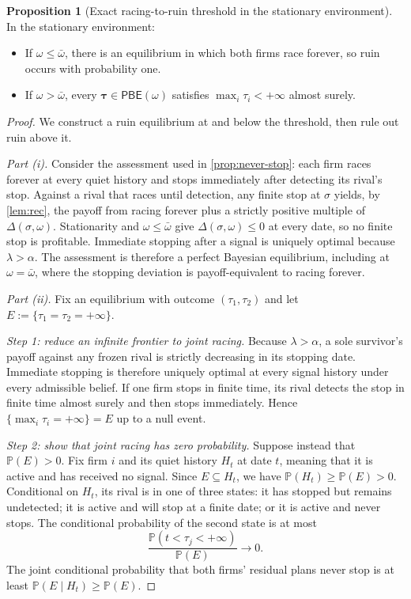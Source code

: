 \documentclass[12pt,reqno]{article}
\renewcommand{\Pr}{\mathbb{P}}
\newcommand{\PBE}{\ensuremath{\mathsf{PBE}}}
\theoremstyle{definition} \newtheorem{example}{Example}
\theoremstyle{definition} \newtheorem{condition}{Condition}
\theoremstyle{definition} \newtheorem{corollary}{Corollary}
\theoremstyle{definition} \newtheorem{claim}{Claim}
\theoremstyle{definition} \newtheorem{definition}{Definition}
\theoremstyle{definition} \newtheorem{conjecture}{Conjecture}
\theoremstyle{definition} \newtheorem{Lemma}{Lemma}
\theoremstyle{definition} \newtheorem{lemma}{Lemma}
\theoremstyle{plain} \newtheorem{theorem}{Theorem}
\theoremstyle{definition} \newtheorem{assumption}{Assumption}
\theoremstyle{definition} \newtheorem*{assumptionnonumber}{Assumption}
\theoremstyle{definition} \newtheorem*{theoremNoNumber}{Proposition}
\theoremstyle{definition}
\theoremstyle{definition}\newtheorem{proposition}{Proposition}
\theoremstyle{definition} \newtheorem{result}{Result}
\theoremstyle{definition} \newtheorem*{definitionNoNumber}{Definition}
\theoremstyle{definition} \newtheorem{Definition}{Definition}
\theoremstyle{definition} \newtheorem*{DefinitionNoNumber}{Definition}
\theoremstyle{definition} \newtheorem*{fact}{Fact}
\theoremstyle{definition} \newtheorem*{property}{Property}
\theoremstyle{definition} \newtheorem{remark}{Remark}
\begin{document}
\begin{proposition}[Exact racing-to-ruin threshold in the stationary environment]
\label{prop:exact-threshold}
In the stationary environment:
\begin{itemize}
\item[(i)] If $\omega\le\bar\omega$, there is an equilibrium in which both
firms race forever, so ruin occurs with probability one.
\item[(ii)] If $\omega>\bar\omega$, every
$\bm\tau\in\PBE(\omega)$ satisfies
$\max_i\tau_i<+\infty$ almost surely.
\end{itemize}
\end{proposition}

\begin{proof}
We construct a ruin equilibrium at and below the threshold, then rule out ruin
above it.

\emph{Part (i).} Consider the assessment used in
\cref{prop:never-stop}: each firm races forever at every quiet history and
stops immediately after detecting its rival's stop. Against a rival that
races until detection, any finite stop at $\sigma$ yields, by
\cref{lem:rec}, the payoff from racing forever plus a strictly positive multiple of
$\Delta(\sigma,\omega)$. Stationarity and $\omega\le\bar\omega$ give
$\Delta(\sigma,\omega)\le0$ at every date, so no finite stop is profitable.
Immediate stopping after a signal is uniquely optimal because
$\lambda>\alpha$. The assessment
is therefore a perfect Bayesian equilibrium,
including at $\omega=\bar\omega$, where the stopping deviation is
payoff-equivalent to racing forever.

\emph{Part (ii).} Fix an equilibrium with outcome
$(\tau_1,\tau_2)$ and let
$
E:=\{\tau_1=\tau_2=+\infty\}.
$

\emph{Step 1: reduce an infinite frontier to joint racing.}
Because $\lambda>\alpha$, a sole survivor's payoff against any frozen rival is
strictly decreasing in its stopping date. Immediate stopping is therefore
uniquely optimal at every signal history under every admissible belief. If one
firm stops in finite time, its rival detects the stop in finite time almost
surely and then stops immediately. Hence
$
\{\max_i\tau_i=+\infty\}=E
$
up to a null event.

\emph{Step 2: show that joint racing has zero probability.}
Suppose instead that $\Pr(E)>0$. Fix firm $i$ and its quiet history $H_t$ at
date $t$, meaning that it is active and has received no signal. Since
$E\subseteq H_t$, we have $\Pr(H_t)\ge\Pr(E)>0$. Conditional on $H_t$, its
rival is in one of three states: it has stopped but remains undetected; it is
active and will stop at a finite date; or it is active and never stops. The
conditional probability of the second state is at most
\[
\frac{\Pr(t<\tau_j<+\infty)}{\Pr(E)}
\longrightarrow0.
\]
The joint conditional probability that both firms' residual plans never stop
is at least $\Pr(E\mid H_t)\ge\Pr(E)$.


\end{proof}
\end{document}
